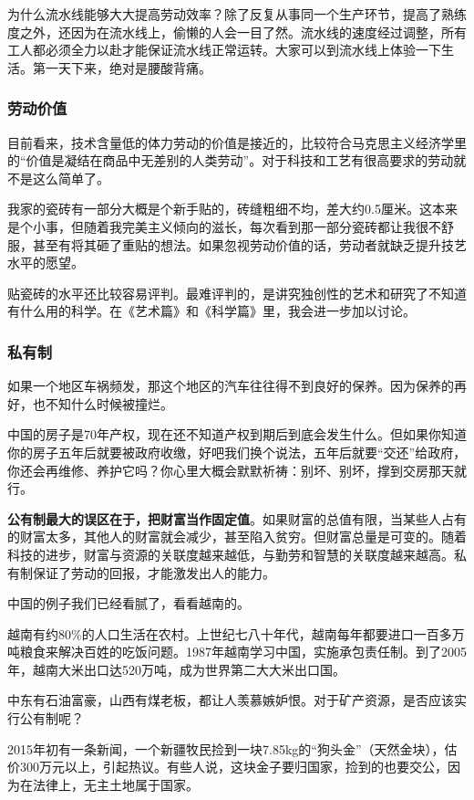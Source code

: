 为什么流水线能够大大提高劳动效率？除了反复从事同一个生产环节，提高了熟练度之外，还因为在流水线上，偷懒的人会一目了然。流水线的速度经过调整，所有工人都必须全力以赴才能保证流水线正常运转。大家可以到流水线上体验一下生活。第一天下来，绝对是腰酸背痛。

\subsubsection{劳动价值}
目前看来，技术含量低的体力劳动的价值是接近的，比较符合马克思主义经济学里的“价值是凝结在商品中无差别的人类劳动”。对于科技和工艺有很高要求的劳动就不是这么简单了。

我家的瓷砖有一部分大概是个新手贴的，砖缝粗细不均，差大约0.5厘米。这本来是个小事，但随着我完美主义倾向的滋长，每次看到那一部分瓷砖都让我很不舒服，甚至有将其砸了重贴的想法。如果忽视劳动价值的话，劳动者就缺乏提升技艺水平的愿望。

贴瓷砖的水平还比较容易评判。最难评判的，是讲究独创性的艺术和研究了不知道有什么用的科学。在《艺术篇》和《科学篇》里，我会进一步加以讨论。

\subsubsection{私有制}
如果一个地区车祸频发，那这个地区的汽车往往得不到良好的保养。因为保养的再好，也不知什么时候被撞烂。

中国的房子是70年产权，现在还不知道产权到期后到底会发生什么。但如果你知道你的房子五年后就要被政府收缴，好吧我们换个说法，五年后就要“交还”给政府，你还会再维修、养护它吗？你心里大概会默默祈祷：别坏、别坏，撑到交房那天就行。

\textbf{公有制最大的误区在于，把财富当作固定值}。如果财富的总值有限，当某些人占有的财富太多，其他人的财富就会减少，甚至陷入贫穷。但财富总量是可变的。随着科技的进步，财富与资源的关联度越来越低，与勤劳和智慧的关联度越来越高。私有制保证了劳动的回报，才能激发出人的能力。

\zPar

中国的例子我们已经看腻了，看看越南的。

越南有约80\%的人口生活在农村。上世纪七八十年代，越南每年都要进口一百多万吨粮食来解决百姓的吃饭问题。1987年越南学习中国，实施承包责任制。到了2005年，越南大米出口达520万吨，成为世界第二大大米出口国。

\zPar

中东有石油富豪，山西有煤老板，都让人羡慕嫉妒恨。对于矿产资源，是否应该实行公有制呢？

2015年初有一条新闻，一个新疆牧民捡到一块7.85kg的“狗头金”（天然金块），估价300万元以上，引起热议。有些人说，这块金子要归国家，捡到的也要交公，因为在法律上，无主土地属于国家。

